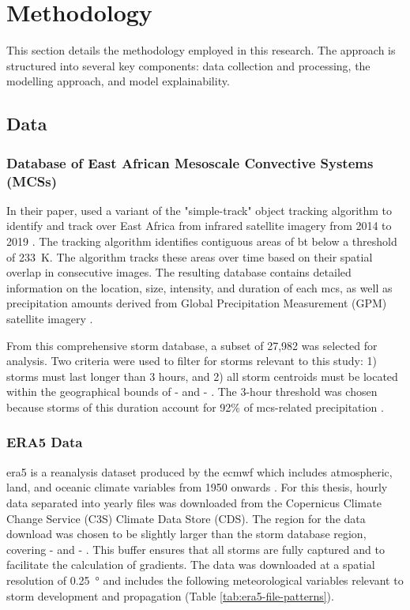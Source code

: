 \chapter{Methodology}
\label{ch:method}

This section details the methodology employed in this research. The approach is structured into several key components: data collection and processing, the modelling approach, and model explainability.

\section{Data}

\subsection{Database of East African Mesoscale Convective Systems (MCSs)}

In their paper, \cite{Hill2023} used a variant of the "simple-track" object tracking algorithm to identify and track  over East Africa from infrared satellite imagery from 2014 to 2019 \citep{Stein2020}. The tracking algorithm identifies contiguous areas of \acrfull{bt} below a threshold of \SI{233}{\kelvin}. The algorithm tracks these areas over time based on their spatial overlap in consecutive images. The resulting database contains detailed information on the location, size, intensity, and duration of each \acrshort{mcs}, as well as precipitation amounts derived from Global Precipitation Measurement (GPM) satellite imagery \citep{Huffman2015}.

From this comprehensive storm database, a subset of 27,982  was selected for analysis. Two criteria were used to filter for storms relevant to this study: 1) storms must last longer than 3 hours, and 2) all storm centroids must be located within the geographical bounds of  -  and  - . The 3-hour threshold was chosen because storms of this duration account for 92\% of \acrshort{mcs}-related precipitation \citep{Hill2023}.

\subsection{ERA5 Data}
\label{sec:era5-data}

\acrshort{era5} is a reanalysis dataset produced by the \acrfull{ecmwf} which includes atmospheric, land, and oceanic climate variables from 1950 onwards \citep{Hersbach2020}. For this thesis, hourly data separated into yearly files was downloaded from the Copernicus Climate Change Service (C3S) Climate Data Store (CDS). The region for the data download was chosen to be slightly larger than the storm database region, covering  -  and  - . This buffer ensures that all storms are fully captured and to facilitate the calculation of gradients. The data was downloaded at a spatial resolution of \SI{0.25}{\degree} and includes the following meteorological variables relevant to storm development and propagation (Table \ref{tab:era5-file-patterns}).


